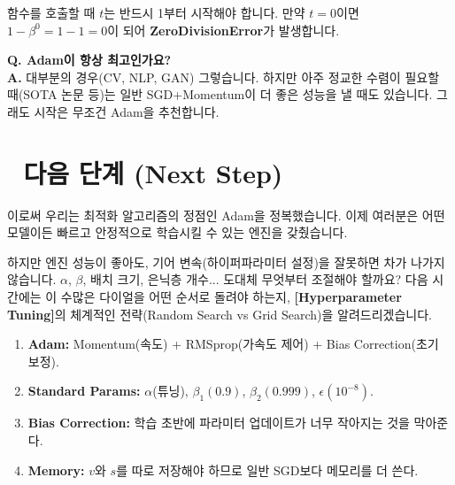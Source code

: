 \documentclass[11pt,a4paper]{book}
\theoremstyle{definition}
\begin{document}
\begin{warningbox}[title={Iteration Count $t$ 주의}]
함수를 호출할 때 $t$는 반드시 1부터 시작해야 합니다. 만약 $t=0$이면 $1 - \beta^0 = 1 - 1 = 0$이 되어 \textbf{ZeroDivisionError}가 발생합니다.
\end{warningbox}

\textbf{Q. Adam이 항상 최고인가요?} \\
\textbf{A.} 대부분의 경우(CV, NLP, GAN) 그렇습니다. 하지만 아주 정교한 수렴이 필요할 때(SOTA 논문 등)는 일반 SGD+Momentum이 더 좋은 성능을 낼 때도 있습니다. 그래도 시작은 무조건 Adam을 추천합니다.

\section*{🔗 다음 단계 (Next Step)}
이로써 우리는 최적화 알고리즘의 정점인 Adam을 정복했습니다. 이제 여러분은 어떤 모델이든 빠르고 안정적으로 학습시킬 수 있는 엔진을 갖췄습니다.

하지만 엔진 성능이 좋아도, 기어 변속(하이퍼파라미터 설정)을 잘못하면 차가 나가지 않습니다. $\alpha$, $\beta$, 배치 크기, 은닉층 개수... 도대체 무엇부터 조절해야 할까요?
다음 시간에는 이 수많은 다이얼을 어떤 순서로 돌려야 하는지, \textbf{[Hyperparameter Tuning]}의 체계적인 전략(Random Search vs Grid Search)을 알려드리겠습니다.

\vspace{0.5cm}

\begin{summarybox}[title={단원 요약 (Cheat Sheet)}]
\begin{enumerate}
    \item \textbf{Adam:} Momentum(속도) + RMSprop(가속도 제어) + Bias Correction(초기 보정).
    \item \textbf{Standard Params:} $\alpha$(튜닝), $\beta_1(0.9)$, $\beta_2(0.999)$, $\epsilon(10^{-8})$.
    \item \textbf{Bias Correction:} 학습 초반에 파라미터 업데이트가 너무 작아지는 것을 막아준다.
    \item \textbf{Memory:} $v$와 $s$를 따로 저장해야 하므로 일반 SGD보다 메모리를 더 쓴다.
\end{enumerate}
\end{summarybox}


\end{document}
